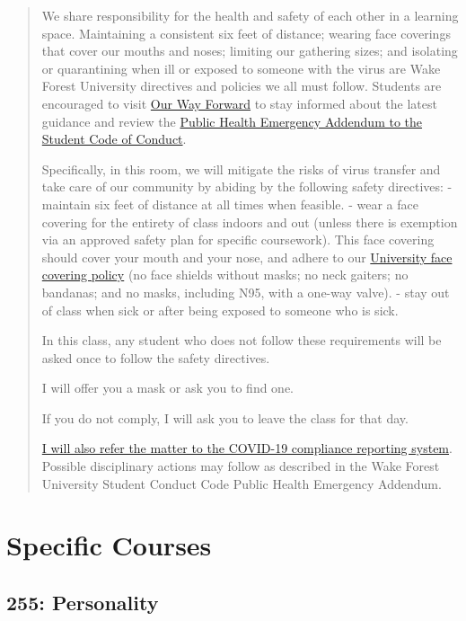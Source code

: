 \begin{quote}
We share responsibility for the health and safety of each other in a learning space. Maintaining a consistent six feet of distance; wearing face coverings that cover our mouths and noses; limiting our gathering sizes; and isolating or quarantining when ill or exposed to someone with the virus are Wake Forest University directives and policies we all must follow. Students are encouraged to visit \href{https://ourwayforward.wfu.edu/}{Our Way Forward} to stay informed about the latest guidance and review the \href{https://studentconduct.wfu.edu/undergraduate-student-handbook/public-health-emergency-addendum/}{Public Health Emergency Addendum to the Student Code of Conduct}.

Specifically, in this room, we will mitigate the risks of virus transfer and take care of our community by abiding by the following safety directives:
- maintain six feet of distance at all times when feasible.
- wear a face covering for the entirety of class indoors and out (unless there is exemption via an approved safety plan for specific coursework). This face covering should cover your mouth and your nose, and adhere to our \href{https://drive.google.com/file/d/1Tqo-by1sjmc-kWUTwAqeNdaHq8OBsU9B/view}{University face covering policy} (no face shields without masks; no neck gaiters; no bandanas; and no masks, including N95, with a one-way valve).
- stay out of class when sick or after being exposed to someone who is sick.

In this class, any student who does not follow these requirements will be asked once to follow the safety directives.

I will offer you a mask or ask you to find one.

If you do not comply, I will ask you to leave the class for that day.

\href{https://cm.maxient.com/reportingform.php?WakeForestUniv\&layout_id=40}{I will also refer the matter to the COVID-19 compliance reporting system}. Possible disciplinary actions may follow as described in the Wake Forest University Student Conduct Code Public Health Emergency Addendum.
\end{quote}

\hypertarget{part-specific-courses}{%
\part*{Specific Courses}\label{part-specific-courses}}


\hypertarget{personality}{%
\chapter*{255: Personality}\label{personality}}


